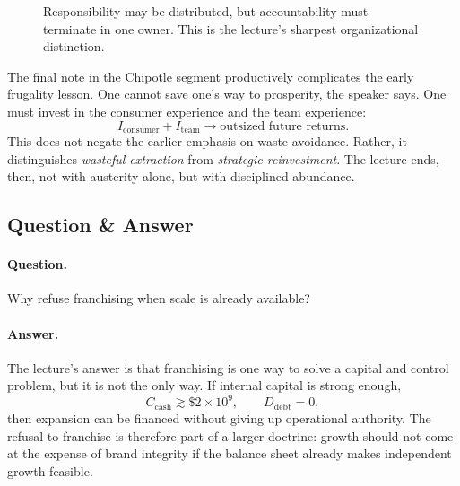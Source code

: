 \begin{figure}
\centering
{}
\caption{Responsibility may be distributed, but accountability must terminate in one owner. This is the lecture's sharpest organizational distinction.}
\end{figure}

The final note in the Chipotle segment productively complicates the early frugality lesson. One cannot save one's way to prosperity, the speaker says. One must invest in the consumer experience and the team experience:
\begin{equation}
I_{\mathrm{consumer}} + I_{\mathrm{team}} \longrightarrow \text{outsized future returns}.
\end{equation}
This does not negate the earlier emphasis on waste avoidance. Rather, it distinguishes \emph{wasteful extraction} from \emph{strategic reinvestment}. The lecture ends, then, not with austerity alone, but with disciplined abundance.

\subsection{Question \& Answer}

\paragraph{Question.} Why refuse franchising when scale is already available?

\paragraph{Answer.} The lecture's answer is that franchising is one way to solve a capital and control problem, but it is not the only way. If internal capital is strong enough,
\[
C_{\mathrm{cash}}\gtrsim \$2\times 10^9, \qquad D_{\mathrm{debt}}=0,
\]
then expansion can be financed without giving up operational authority. The refusal to franchise is therefore part of a larger doctrine: growth should not come at the expense of brand integrity if the balance sheet already makes independent growth feasible.

